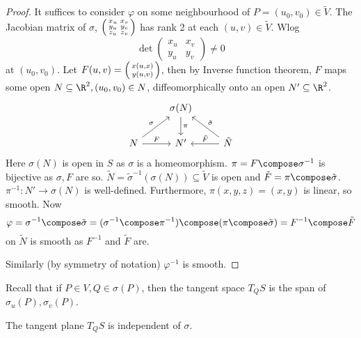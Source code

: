 \documentclass[a4paper]{article}
\theoremstyle{definition}
\begin{document}
\begin{proof}
  It suffices to consider \(\varphi\) on some neighbourhood of \(P = (u_0, v_0) \in \tilde V\). The Jacobian matrix of \(\sigma\), \(\begin{psmallmatrix} x_u & x_v \\ y_u & y_v \\ z_u & z_v \end{psmallmatrix}\) has rank 2 at each \((u, v) \in \tilde V\). Wlog
  \[
    \det
    \begin{pmatrix}
      x_u & x_v \\
      y_u & y_v
    \end{pmatrix}
    \neq 0
  \]
  at \((u_0, v_0)\). Let \(F(u, v) = \begin{psmallmatrix} x(u, x) \\ y(u, v) \end{psmallmatrix}\), then by Inverse function theorem, \(F\) maps some open \(N \subseteq \R^2, (u_0, v_0) \in N\), diffeomorphically onto an open \(N' \subseteq \R^2\).
  \[
    \begin{tikzcd}
      & \sigma(N) \ar[d, "\pi"] \\
      N \ar[ur, "\sigma"] \ar[r, "F"] & N' & \tilde N \ar[ul, "\tilde \sigma"'] \ar[l, "\tilde F"']
    \end{tikzcd}
  \]
  Here \(\sigma(N)\) is open in \(S\) as \(\sigma\) is a homeomorphism. \(\pi = F \compose \sigma^{-1}\) is bijective as \(\sigma, F\) are so. \(\tilde N = \tilde \sigma^{-1}(\sigma(N)) \subseteq \tilde V\) is open and \(\tilde F = \pi \compose \tilde \sigma\). \(\pi^{-1}: N' \to \sigma(N)\) is well-defined. Furthermore, \(\pi(x, y, z) = (x, y)\) is linear, so smooth. Now
  \[
    \varphi = \sigma^{-1} \compose \tilde \sigma = (\sigma^{-1} \compose \pi^{-1}) \compose (\pi \compose \tilde \sigma) = F^{-1} \compose \tilde F
  \]
  on \(\tilde N\) is smooth as \(F^{-1}\) and \(\tilde F\) are.

  Similarly (by symmetry of notation) \(\varphi^{-1}\) is smooth.
\end{proof}

Recall that if \(P \in V, Q \in \sigma(P)\), then the tangent space \(T_QS\) is the span of \(\sigma_u(P), \sigma_v(P)\).

\begin{corollary}
  The tangent plane \(T_QS\) is independent of \(\sigma\).
\end{corollary}
\end{document}
